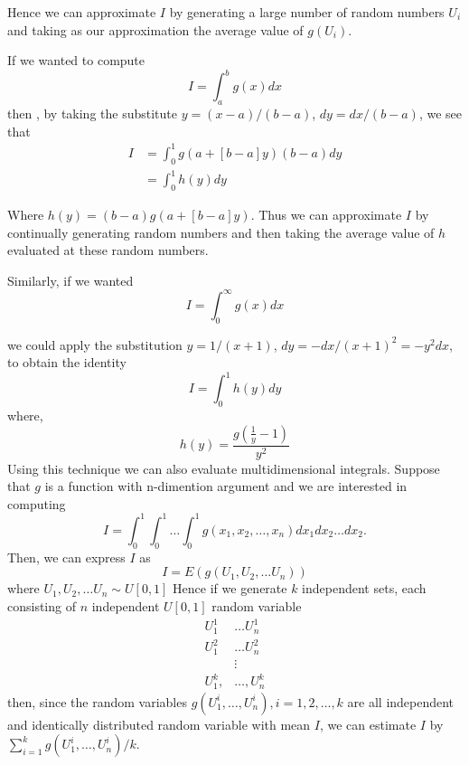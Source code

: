 Hence we can approximate $I$ by generating a large number of random numbers $U_i$ and taking
as our approximation the average value of $g(U_i)$.

If we wanted to compute
\[
	I = \int_{a}^{b} g(x) dx
\]
then , by taking the substitute $y=(x-a)/(b-a)$, $dy = dx/(b-a)$, we see that
\begin{align*}
	I & = \int_{0}^{1} g(a+[b-a]y)(b-a)dy \\
	  & = \int_{ 0}^{1} h(y) dy
\end{align*}

Where $h(y)= (b-a)g(a+[b-a]y)$. Thus we can approximate $I$ by continually generating random
numbers and then taking the average value of $h$ evaluated at these random numbers.

Similarly, if we wanted
\[
	I = \int_{0}^{\infty} g(x) dx
\]

we could apply the substitution $y=1/(x+1)$, $dy=-dx/(x+1)^{2} = -y ^{2} dx$, to obtain the identity
\[
	I=\int_{0}^{1} h(y)dy
\]
where, \[
	h(y) = \frac{g(\frac{1}{y} -1)}{y ^{2}}
\]
Using this technique we can also evaluate multidimensional integrals. Suppose that $g$ is a function with n-dimention argument
and we are interested in computing
\[
	I = \int_{0}^{1} \int_{0}^{1} \ldots \int_{0}^{1} g(x_1, x_2 , \ldots , x_n) dx_1 dx_2 \ldots dx_2.
\]
Then, we can express $I$ as
\[
	I = E(g(U_1, U_2, \ldots U_n))
\]
where $U_1, U_2, \ldots U_n \sim U[0,1]$  Hence  if we generate $k$ independent sets, each consisting of $n$ independent $U[0,1]$
random variable
\begin{align*}
	U_1^{1}   & \ldots U_n^{1}  \\
	U_1^{2}   & \ldots U_n^{2}  \\
	          & \vdots          \\
	U_1^{k} , & \ldots, U_n^{k}
\end{align*}
then, since the random variables $g(U_1^{i},\ldots, U_n^{i}), i = 1,2,\ldots,k  $ are all independent and identically distributed
random variable with mean $I$, we can estimate $I$ by $\sum_{i = 1}^{k}g(U_1^{i} , \ldots, U_n^{i} )/k $.

